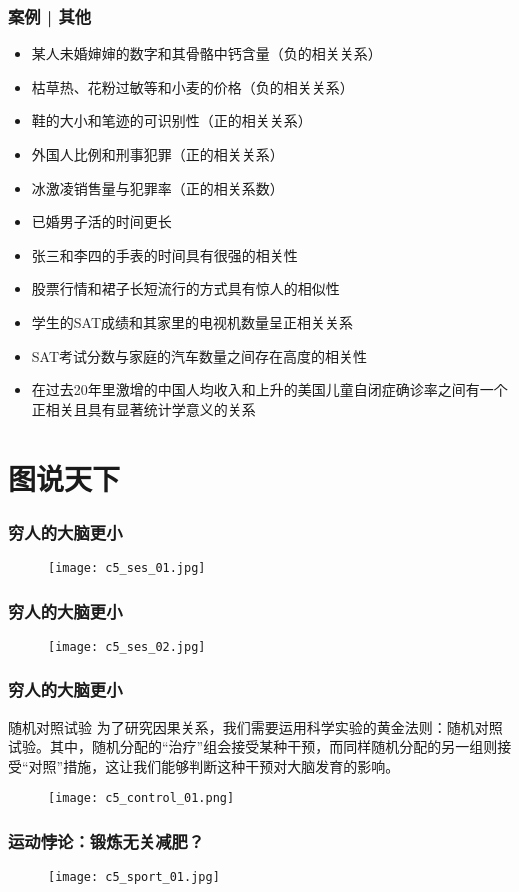 \begin{frame}
  \frametitle{案例 | 其他}
  \begin{itemize}
    \item 某人未婚婶婶的数字和其骨骼中钙含量（负的相关关系）
    \item 枯草热、花粉过敏等和小麦的价格（负的相关关系）
    \item 鞋的大小和笔迹的可识别性（正的相关关系）
    \item 外国人比例和刑事犯罪（正的相关关系）
    \item 冰激凌销售量与犯罪率（正的相关系数）
    \item 已婚男子活的时间更长
    \item 张三和李四的手表的时间具有很强的相关性
    \item 股票行情和裙子长短流行的方式具有惊人的相似性
    \item 学生的SAT成绩和其家里的电视机数量呈正相关关系
    \item SAT考试分数与家庭的汽车数量之间存在高度的相关性
    \item 在过去20年里激增的中国人均收入和上升的美国儿童自闭症确诊率之间有一个正相关且具有显著统计学意义的关系
  \end{itemize}
\end{frame}

\section{图说天下}
\begin{frame}
  \frametitle{穷人的大脑更小}
  \begin{figure}
    \centering
    \texttt{[image: c5\_ses\_01.jpg]}
  \end{figure}
\end{frame}

\begin{frame}
  \frametitle{穷人的大脑更小}
  \begin{figure}
    \centering
    \texttt{[image: c5\_ses\_02.jpg]}
  \end{figure}
\end{frame}

\begin{frame}
  \frametitle{穷人的大脑更小}
  \begin{block}{随机对照试验}
为了研究因果关系，我们需要运用科学实验的黄金法则：随机对照试验。其中，随机分配的“治疗”组会接受某种干预，而同样随机分配的另一组则接受“对照”措施，这让我们能够判断这种干预对大脑发育的影响。
  \end{block}
  \begin{figure}
    \centering
    \texttt{[image: c5\_control\_01.png]}
  \end{figure}
\end{frame}

\begin{frame}
  \frametitle{运动悖论：锻炼无关减肥？}
  \begin{figure}
    \centering
    \texttt{[image: c5\_sport\_01.jpg]}
  \end{figure}
\end{frame}




